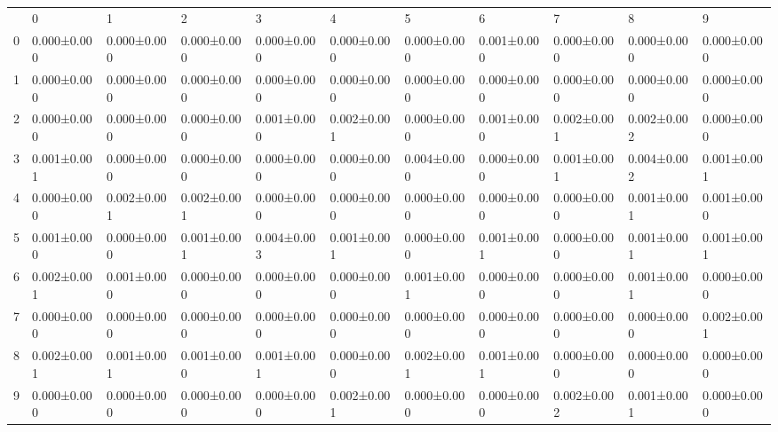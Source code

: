 \begin{tabular}{lllllllllll}
 & 0 & 1 & 2 & 3 & 4 & 5 & 6 & 7 & 8 & 9 \\
0 & 0.000±0.000 & 0.000±0.000 & 0.000±0.000 & 0.000±0.000 & 0.000±0.000 & 0.000±0.000 & 0.001±0.000 & 0.000±0.000 & 0.000±0.000 & 0.000±0.000 \\
1 & 0.000±0.000 & 0.000±0.000 & 0.000±0.000 & 0.000±0.000 & 0.000±0.000 & 0.000±0.000 & 0.000±0.000 & 0.000±0.000 & 0.000±0.000 & 0.000±0.000 \\
2 & 0.000±0.000 & 0.000±0.000 & 0.000±0.000 & 0.001±0.000 & 0.002±0.001 & 0.000±0.000 & 0.001±0.000 & 0.002±0.001 & 0.002±0.002 & 0.000±0.000 \\
3 & 0.001±0.001 & 0.000±0.000 & 0.000±0.000 & 0.000±0.000 & 0.000±0.000 & 0.004±0.000 & 0.000±0.000 & 0.001±0.001 & 0.004±0.002 & 0.001±0.001 \\
4 & 0.000±0.000 & 0.002±0.001 & 0.002±0.001 & 0.000±0.000 & 0.000±0.000 & 0.000±0.000 & 0.000±0.000 & 0.000±0.000 & 0.001±0.001 & 0.001±0.000 \\
5 & 0.001±0.000 & 0.000±0.000 & 0.001±0.001 & 0.004±0.003 & 0.001±0.001 & 0.000±0.000 & 0.001±0.001 & 0.000±0.000 & 0.001±0.001 & 0.001±0.001 \\
6 & 0.002±0.001 & 0.001±0.000 & 0.000±0.000 & 0.000±0.000 & 0.000±0.000 & 0.001±0.001 & 0.000±0.000 & 0.000±0.000 & 0.001±0.001 & 0.000±0.000 \\
7 & 0.000±0.000 & 0.000±0.000 & 0.000±0.000 & 0.000±0.000 & 0.000±0.000 & 0.000±0.000 & 0.000±0.000 & 0.000±0.000 & 0.000±0.000 & 0.002±0.001 \\
8 & 0.002±0.001 & 0.001±0.001 & 0.001±0.000 & 0.001±0.001 & 0.000±0.000 & 0.002±0.001 & 0.001±0.001 & 0.000±0.000 & 0.000±0.000 & 0.000±0.000 \\
9 & 0.000±0.000 & 0.000±0.000 & 0.000±0.000 & 0.000±0.000 & 0.002±0.001 & 0.000±0.000 & 0.000±0.000 & 0.002±0.002 & 0.001±0.001 & 0.000±0.000 \\
\end{tabular}
